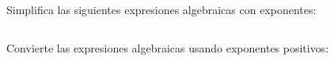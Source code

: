 \documentclass[12pt,addpoints]{evalua}
\begin{document}
\begin{questions}
      \subsection*{\else{}\fi}
      \question[4] Simplifica las siguientes expresiones algebraicas con exponentes:
      \begin{multicols}{2}
      \end{multicols}

      \newpage
      \subsection*{\else{}\fi}
      \question[6] Convierte las expresiones algebraicas usando exponentes positivos:
      \begin{multicols}{3}
\end{multicols}
\end{questions}
\end{document}
